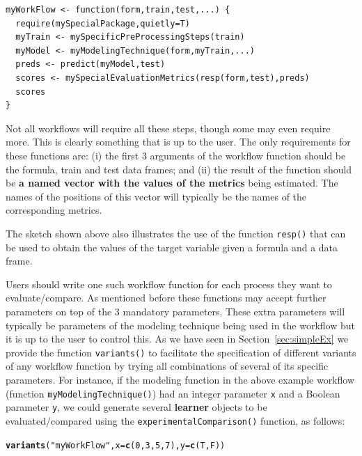 \documentclass[10pt,a4paper]{article}\usepackage[]{graphicx}\usepackage[]{color}
\makeatletter
\newcommand{\hlnum}[1]{\textcolor[rgb]{0.686,0.059,0.569}{#1}}%
\newcommand{\hlstr}[1]{\textcolor[rgb]{0.192,0.494,0.8}{#1}}%
\newcommand{\hlstd}[1]{\textcolor[rgb]{0.345,0.345,0.345}{#1}}%
\newcommand{\hlkwc}[1]{\textcolor[rgb]{0.333,0.667,0.333}{#1}}%
\newcommand{\hlkwd}[1]{\textcolor[rgb]{0.737,0.353,0.396}{\textbf{#1}}}%
\newenvironment{kframe}{%
 \def\at@end@of@kframe{}%
 \ifinner\ifhmode%
  \def\at@end@of@kframe{\end{minipage}}%
  \begin{minipage}{\columnwidth}%
 \fi\fi%
 \def\FrameCommand##1{\hskip\@totalleftmargin \hskip-\fboxsep
 \colorbox{shadecolor}{##1}\hskip-\fboxsep
     \hskip-\linewidth \hskip-\@totalleftmargin \hskip\columnwidth}%
 \MakeFramed {\advance\hsize-\width
   \@totalleftmargin\z@ \linewidth\hsize
   \@setminipage}}%
 {\par\unskip\endMakeFramed%
 \at@end@of@kframe}
\newenvironment{knitrout}{}{} %
\makeatother
\begin{document}
\begin{Verbatim}
myWorkFlow <- function(form,train,test,...) {
  require(mySpecialPackage,quietly=T)
  myTrain <- mySpecificPreProcessingSteps(train)
  myModel <- myModelingTechnique(form,myTrain,...)
  preds <- predict(myModel,test)
  scores <- mySpecialEvaluationMetrics(resp(form,test),preds)
  scores
}
\end{Verbatim}

Not all workflows will require all these steps, though some may even
require more. This is clearly something that is up to the user. The
only requirements for these functions are: (i) the first 3 arguments
of the workflow function should be the formula, train and test data
frames; and (ii) the result of the function should be \textbf{a named
  vector with the values of the metrics} being estimated. The names of
the positions of this vector will typically be the names of the
corresponding metrics.

The sketch shown above also illustrates the use of the function
\texttt{resp()} that can be used to obtain the values of the target
variable given a formula and a data frame.

Users should write one such workflow function for each process they
want to evaluate/compare. As mentioned before these functions may
accept further parameters on top of the 3 mandatory parameters. These
extra parameters will typically be parameters of the modeling
technique being used in the workflow but it is up to the user to
control this. As we have seen in Section~\ref{sec:simpleEx} we provide
the function \texttt{variants()} to facilitate the specification of
different variants of any workflow function by trying all combinations
of several of its specific parameters. For instance, if the modeling
function in the above example workflow (function
\texttt{myModelingTechnique()}) had an integer parameter \texttt{x}
and a Boolean parameter \texttt{y}, we could generate several
\textbf{learner} objects to be evaluated/compared using the
\texttt{experimentalComparison()} function, as follows:

\begin{knitrout}
\color{fgcolor}\begin{kframe}
\begin{alltt}
\hlkwd{variants}\hlstd{(}\hlstr{"myWorkFlow"}\hlstd{,} \hlkwc{x} \hlstd{=} \hlkwd{c}\hlstd{(}\hlnum{0}\hlstd{,} \hlnum{3}\hlstd{,} \hlnum{5}\hlstd{,} \hlnum{7}\hlstd{),} \hlkwc{y} \hlstd{=} \hlkwd{c}\hlstd{(T, F))}
\end{alltt}
\end{kframe}
\end{knitrout}
\end{document}
